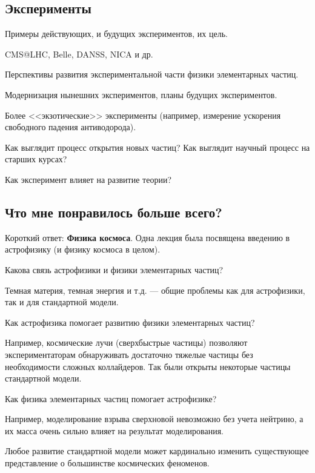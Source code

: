 \documentclass[a4paper,12pt]{report}
\begin{document}
  \subsection{Эксперименты}
  \begin{compactitem}
      \item Примеры действующих, и будущих экспериментов, их цель.
      \begin{compactitem}
        \item CMS@LHC, Belle, DANSS, NICA и др.
      \end{compactitem}
      \item Перспективы развития экспериментальной части физики элементарных частиц.
      \begin{compactitem}
        \item Модернизация нынешних экспериментов, планы будущих экспериментов.
      \end{compactitem}
      \item Более <<экзотические>> эксперименты (например, измерение ускорения свободного падения антиводорода).
      \item Как выглядит процесс открытия новых частиц? Как выглядит научный процесс на старших курсах?
      \item Как эксперимент влияет на развитие теории?
  \end{compactitem}
  \subsection{Что мне понравилось больше всего?}
  Короткий ответ: \textbf{Физика космоса}. Одна лекция была посвящена введению в астрофизику (и физику космоса в целом).
  \begin{compactitem}
    \item Какова связь астрофизики и физики элементарных частиц?
    \begin{compactitem}
      \item Темная материя, темная энергия и т.д. --- общие проблемы как для астрофизики, так и для стандартной модели.
    \end{compactitem}
    \item Как астрофизика помогает развитию физики элементарных частиц?
    \begin{compactitem}
      \item Например, космические лучи (сверхбыстрые частицы) позволяют экспериментаторам обнаруживать достаточно тяжелые частицы без необходимости сложных коллайдеров. Так были открыты некоторые частицы стандартной модели.
    \end{compactitem}
    \item Как физика элементарных частиц помогает астрофизике?
    \begin{compactitem}
      \item Например, моделирование взрыва сверхновой невозможно без учета нейтрино, а их масса очень сильно влияет на результат моделирования.
      \item Любое развитие стандартной модели может кардинально изменить существующее представление о большинстве космических феноменов.
    \end{compactitem}
  \end{compactitem}
  
  
\end{document}
